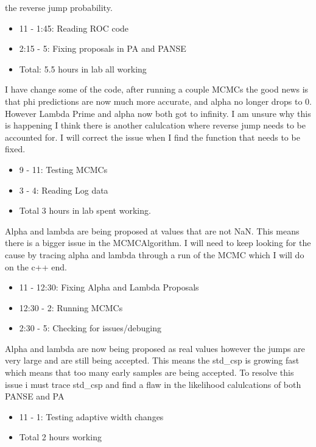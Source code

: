 \documentclass[12pt,hyperref]{labbook}
\begin{document}
the reverse jump probability.
\begin{itemize}
    \item 11 - 1:45: Reading ROC code
    \item 2:15 - 5: Fixing proposals in PA and PANSE
    \item Total: 5.5 hours in lab all working
\end{itemize}
I have change some of the code, after running a couple MCMCs the good news is that phi predictions are now much more accurate, and alpha no longer drops to 0. However Lambda Prime and alpha now both got to infinity. I am unsure why this is happening I think there is another calulcation where reverse jump needs to be accounted for. I will correct the issue when I find the function that needs to be fixed.
\begin{itemize}
    \item 9 - 11: Testing MCMCs
    \item 3 - 4: Reading Log data
    \item Total 3 hours in lab spent working.
\end{itemize}
Alpha and lambda are being proposed at values that are not NaN. This means there is a bigger issue in the MCMCAlgorithm. I will need to keep looking for the cause by tracing alpha and lambda through a run of the MCMC which I will do on the c++ end.
\begin{itemize}
    \item 11 - 12:30: Fixing Alpha and Lambda Proposals
    \item 12:30 - 2: Running MCMCs
    \item 2:30 - 5: Checking for issues/debuging
\end{itemize}
Alpha and lambda are now being proposed as real values however the jumps are very large and are still being accepted. This means the std_csp is growing fast which means that too many early samples are being accepted. To resolve this issue i must trace std_csp and find a flaw in the likelihood calulcations of both PANSE and PA
\begin{itemize}
    \item 11 - 1: Testing adaptive width changes
    \item Total 2 hours working
\end{itemize}
\end{document}

